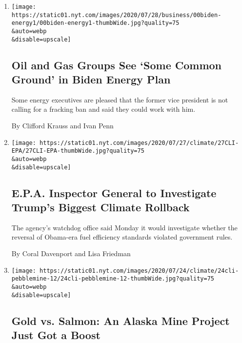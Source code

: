 \begin{enumerate}
\def\labelenumi{\arabic{enumi}.}
\item
  \href{/2020/07/28/business/energy-environment/joe-biden-oil-gas-energy.html}{}

  \texttt{[image: https://static01.nyt.com/images/2020/07/28/business/00biden-energy1/00biden-energy1-thumbWide.jpg?quality=75\\\&auto=webp\\\&disable=upscale]}

  \hypertarget{oil-and-gas-groups-see-some-common-ground-in-biden-energy-plan}{%
  \subsection{Oil and Gas Groups See `Some Common Ground' in Biden
  Energy
  Plan}\label{oil-and-gas-groups-see-some-common-ground-in-biden-energy-plan}}

  Some energy executives are pleased that the former vice president is
  not calling for a fracking ban and said they could work with him.

  By Clifford Krauss and Ivan Penn
\item
  \href{/2020/07/27/climate/trump-fuel-efficiency-rule.html}{}

  \texttt{[image: https://static01.nyt.com/images/2020/07/27/climate/27CLI-EPA/27CLI-EPA-thumbWide.jpg?quality=75\\\&auto=webp\\\&disable=upscale]}

  \hypertarget{epa-inspector-general-to-investigate-trumps-biggest-climate-rollback}{%
  \subsection{E.P.A. Inspector General to Investigate Trump's Biggest
  Climate
  Rollback}\label{epa-inspector-general-to-investigate-trumps-biggest-climate-rollback}}

  The agency's watchdog office said Monday it would investigate whether
  the reversal of Obama-era fuel efficiency standards violated
  government rules.

  By Coral Davenport and Lisa Friedman
\item
  \href{/2020/07/24/climate/pebble-mine-alaska-environment.html}{}

  \texttt{[image: https://static01.nyt.com/images/2020/07/24/climate/24cli-pebblemine-12/24cli-pebblemine-12-thumbWide.jpg?quality=75\\\&auto=webp\\\&disable=upscale]}

  \hypertarget{gold-vs-salmon-an-alaska-mine-project-just-got-a-boost}{%
  \subsection{Gold vs. Salmon: An Alaska Mine Project Just Got a
  Boost}\label{gold-vs-salmon-an-alaska-mine-project-just-got-a-boost}}


\end{enumerate}
